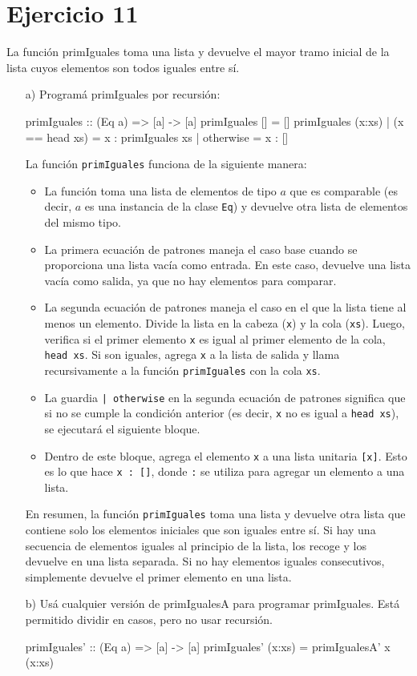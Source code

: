 \documentclass{article}
\begin{document}
\section*{Ejercicio 11}
La función primIguales toma una lista y devuelve el mayor tramo inicial de la lista cuyos elementos son todos iguales entre sí.

\begin{itemize}
    \item[a)] Programá primIguales por recursión:
\begin{haskell}
primIguales :: (Eq a) => [a] -> [a] 
primIguales [] = []
primIguales (x:xs) | (x == head xs) = x : primIguales xs 
                   | otherwise = x : []
\end{haskell}

La función \texttt{primIguales} funciona de la siguiente manera:

\begin{itemize}
    \item La función toma una lista de elementos de tipo $a$ que es comparable (es decir, $a$ es una instancia de la clase \texttt{Eq}) y devuelve otra lista de elementos del mismo tipo.
    \item La primera ecuación de patrones maneja el caso base cuando se proporciona una lista vacía como entrada. En este caso, devuelve una lista vacía como salida, ya que no hay elementos para comparar.
    \item La segunda ecuación de patrones maneja el caso en el que la lista tiene al menos un elemento. Divide la lista en la cabeza (\texttt{x}) y la cola (\texttt{xs}). Luego, verifica si el primer elemento \texttt{x} es igual al primer elemento de la cola, \texttt{head xs}. Si son iguales, agrega \texttt{x} a la lista de salida y llama recursivamente a la función \texttt{primIguales} con la cola \texttt{xs}.
    \item La guardia \texttt{| otherwise} en la segunda ecuación de patrones significa que si no se cumple la condición anterior (es decir, \texttt{x} no es igual a \texttt{head xs}), se ejecutará el siguiente bloque.
    \item Dentro de este bloque, agrega el elemento \texttt{x} a una lista unitaria \texttt{[x]}. Esto es lo que hace \texttt{x : []}, donde \texttt{:} se utiliza para agregar un elemento a una lista.
\end{itemize}

En resumen, la función \texttt{primIguales} toma una lista y devuelve otra lista que contiene solo los elementos iniciales que son iguales entre sí. Si hay una secuencia de elementos iguales al principio de la lista, los recoge y los devuelve en una lista separada. Si no hay elementos iguales consecutivos, simplemente devuelve el primer elemento en una lista.

    \item[b)] Usá cualquier versión de primIgualesA para programar primIguales. Está permitido dividir en casos, pero no usar recursión.
\begin{haskell}
primIguales' :: (Eq a) => [a] -> [a]
primIguales' (x:xs) = primIgualesA' x (x:xs)        
\end{haskell}
\end{itemize}
\newpage
\end{document}

